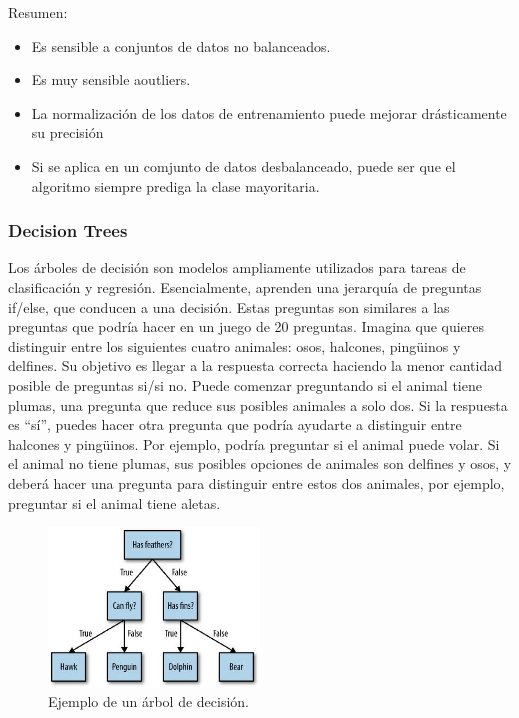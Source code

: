 \documentclass[../main.tex]{subfiles}
\begin{document}
            Resumen:
            \begin{itemize}
                \item Es sensible a conjuntos de datos no balanceados.
                \item Es muy sensible aoutliers.
                \item La normalización de los datos de entrenamiento puede mejorar drásticamente su precisión
                \item Si se aplica en un comjunto de datos desbalanceado, puede ser que el algoritmo siempre prediga la clase mayoritaria. 
            \end{itemize}
    
        \subsubsection{Decision Trees}
            Los árboles de decisión son modelos ampliamente utilizados para tareas de clasificación y regresión. Esencialmente, aprenden una jerarquía de preguntas if/else, que conducen a una decisión. Estas preguntas son similares a las preguntas que podría hacer en un juego de 20 preguntas. Imagina que quieres distinguir entre los siguientes cuatro animales: osos, halcones, pingüinos y delfines. Su objetivo es llegar a la respuesta correcta haciendo la menor cantidad posible de preguntas si/si no. Puede comenzar preguntando si el animal tiene plumas, una pregunta que reduce sus posibles animales a solo dos. Si la respuesta es “sí”, puedes hacer otra pregunta que podría ayudarte a distinguir entre halcones y pingüinos. Por ejemplo, podría preguntar si el animal puede volar. Si el animal no tiene plumas, sus posibles opciones de animales son delfines y osos, y deberá hacer una pregunta para distinguir entre estos dos animales, por ejemplo, preguntar si el animal tiene aletas.

            \begin{figure}[ht]
                \centering
                \includegraphics[width=0.5\textwidth]{./images/decision_trees_01.jpg}
                \caption{Ejemplo de un árbol de decisión.}
                \label{fig:tree_01}
            \end{figure}
\end{document}
